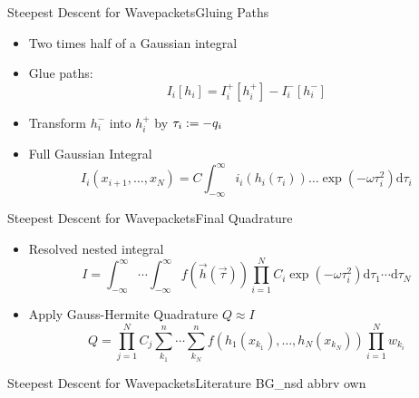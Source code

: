\documentclass{beamer}
\begin{document}
\begin{frame}{Steepest Descent for Wavepackets}{Gluing Paths}
  \begin{itemize}
    \item Two times half of a Gaussian integral
    \item Glue paths:
    \begin{equation*}
      I_i[h_i] =
      I_i^{+}[h_i^{+}]
      -
      I_i^{-}[h_i^{-}]
    \end{equation*}
    \item Transform $h_i^{-}$ into $h_i^{+}$ by $\tau_i := -q_i$
    \item Full Gaussian Integral
    \begin{equation*}
      I_i\left(x_{i+1},\ldots,x_N\right) =
      C
      \int_{-\infty}^\infty
        i_i\left(h_i\left(\tau_i\right)\right)
        \ldots
        \exp\left(- \omega \tau_i^2\right)
      \mathrm{d}\tau_i
    \end{equation*}
  \end{itemize}
\end{frame}


\begin{frame}{Steepest Descent for Wavepackets}{Final Quadrature}
  \begin{itemize}
    \item Resolved nested integral
    \begin{equation*}
      I = \int_{-\infty}^\infty \cdots \int_{-\infty}^\infty
          f\left(\vec{h}(\vec{\tau})\right)
          \prod_{i=1}^N C_i
                        \exp\left(-\omega \tau_i^2\right)
          \mathrm{d}\tau_1 \cdots \mathrm{d}\tau_N
    \end{equation*}
    \item Apply Gauss-Hermite Quadrature $Q \approx I$
    \begin{equation*}
      Q =
      \prod_{j=1}^N
      C_j
      \sum_{k_1}^n \cdots \sum_{k_N}^n
      f\left(h_1\left(x_{k_1}\right),
           \ldots,
           h_N\left(x_{k_N}\right)
    \right)
    \prod_{i=1}^N w_{k_i}
    \end{equation*}
  \end{itemize}
\end{frame}


\begin{frame}{Steepest Descent for Wavepackets}{Literature}
  \nocite{sdwp}{BG_nsd}
  \scriptsize
  {abbrv}
  {own}{}
\end{frame}
\end{document}
